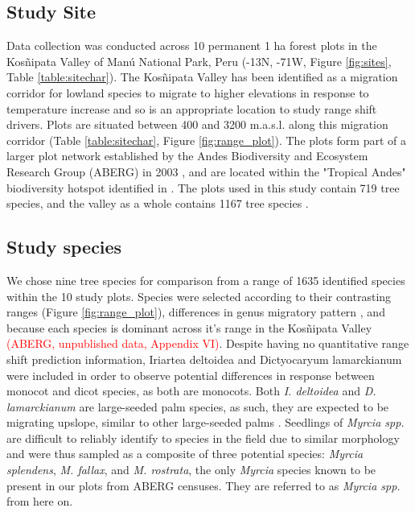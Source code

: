 \documentclass[a4paper,11pt]{article}
\newcommand{\todo}[1]{\textcolor{red}{#1}}   %
\begin{document}
\subsection*{Study Site}
Data collection was conducted across 10 permanent 1 ha forest plots in the Kos\~{n}ipata Valley of Man\'{u} National Park, Peru (-13\textdegree N, -71\textdegree W, Figure \ref{fig:sites}, Table \ref{table:sitechar}). The Kos\~{n}ipata Valley has been identified as a migration corridor for lowland species to migrate to higher elevations in response to temperature increase \citep{Feeley2011} and so is an appropriate location to study range shift drivers. Plots are situated between 400 and 3200 m.a.s.l. along this migration corridor (Table \ref{table:sitechar}, Figure \ref{fig:range_plot}). The plots form part of a larger plot network established by the Andes Biodiversity and Ecosystem Research Group (ABERG) in 2003 \citep{Malhi2010, Girardin2013a}, and are located within the "Tropical Andes" biodiversity hotspot identified in \citet{Myers2000}. The plots used in this study contain 719 tree species, and the valley as a whole contains 1167 tree species \citep{}.

\subsection*{Study species} 
We chose nine tree species for comparison from a range of 1635 identified species within the 10 study plots. Species were selected according to their contrasting ranges (Figure \ref{fig:range_plot}), differences in genus migratory pattern \citep{Feeley2011}, and because each species is dominant across it's range in the Kos\~{n}ipata Valley \todo{(ABERG, unpublished data, Appendix VI)}. Despite having no quantitative range shift prediction information, Iriartea deltoidea and Dictyocaryum lamarckianum were included in order to observe potential differences in response between monocot and dicot species, as both are monocots. Both \textit{I. deltoidea} and \textit{D. lamarckianum} are large-seeded palm species, as such, they are expected to be migrating upslope, similar to other large-seeded palms \citep{Hillyer2010}. Seedlings of \textit{Myrcia spp.} are difficult to reliably identify to species in the field due to similar morphology and were thus sampled as a composite of three potential species: \textit{Myrcia splendens}, \textit{M. fallax}, and \textit{M. rostrata}, the only \textit{Myrcia} species known to be present in our plots from ABERG censuses. They are referred to as \textit{Myrcia spp.} from here on. 
\end{document}

